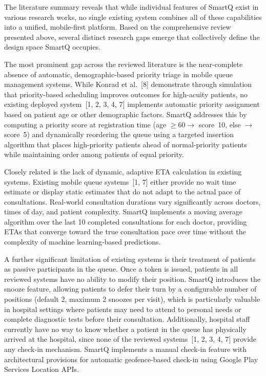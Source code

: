 \documentclass[12pt,a4paper]{article}
\begin{document}
The literature summary reveals that while individual features of SmartQ exist in various research works, no single existing system combines all of these capabilities into a unified, mobile-first platform. Based on the comprehensive review presented above, several distinct research gaps emerge that collectively define the design space SmartQ occupies.

The most prominent gap across the reviewed literature is the near-complete absence of automatic, demographic-based priority triage in mobile queue management systems. While Konrad et al.~[8] demonstrate through simulation that priority-based scheduling improves outcomes for high-acuity patients, no existing deployed system~[1, 2, 3, 4, 7] implements automatic priority assignment based on patient age or other demographic factors. SmartQ addresses this by computing a priority score at registration time (age $\geq 60 \rightarrow$ score~10, else $\rightarrow$ score~5) and dynamically reordering the queue using a targeted insertion algorithm that places high-priority patients ahead of normal-priority patients while maintaining order among patients of equal priority.

Closely related is the lack of dynamic, adaptive ETA calculation in existing systems. Existing mobile queue systems~[1, 7] either provide no wait time estimate or display static estimates that do not adapt to the actual pace of consultations. Real-world consultation durations vary significantly across doctors, times of day, and patient complexity. SmartQ implements a moving average algorithm over the last 10 completed consultations for each doctor, providing ETAs that converge toward the true consultation pace over time without the complexity of machine learning-based predictions.

A further significant limitation of existing systems is their treatment of patients as passive participants in the queue. Once a token is issued, patients in all reviewed systems have no ability to modify their position. SmartQ introduces the snooze feature, allowing patients to defer their turn by a configurable number of positions (default 2, maximum 2 snoozes per visit), which is particularly valuable in hospital settings where patients may need to attend to personal needs or complete diagnostic tests before their consultation. Additionally, hospital staff currently have no way to know whether a patient in the queue has physically arrived at the hospital, since none of the reviewed systems~[1, 2, 3, 4, 7] provide any check-in mechanism. SmartQ implements a manual check-in feature with architectural provisions for automatic geofence-based check-in using Google Play Services Location APIs.
\end{document}
